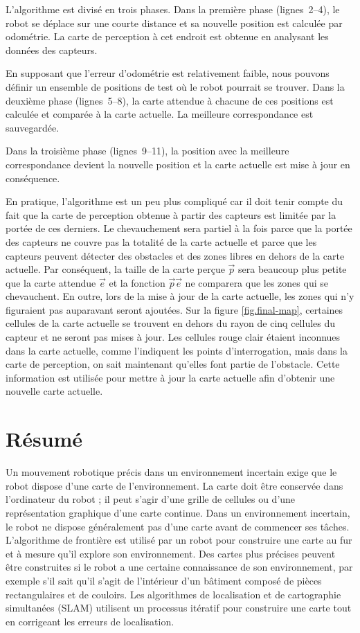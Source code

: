 L'algorithme est divisé en trois phases. Dans la première phase (lignes~2--4), le robot se déplace sur une courte distance et sa nouvelle position est calculée par odométrie. La carte de perception à cet endroit est obtenue en analysant les données des capteurs.

En supposant que l'erreur d'odométrie est relativement faible, nous pouvons définir un ensemble de positions de test où le robot pourrait se trouver. Dans la deuxième phase (lignes~5--8), la carte attendue à chacune de ces positions est calculée et comparée à la carte actuelle. La meilleure correspondance est sauvegardée.

Dans la troisième phase (lignes~9--11), la position avec la meilleure correspondance devient la nouvelle position et la carte actuelle est mise à jour en conséquence.

En pratique, l'algorithme est un peu plus compliqué car il doit tenir compte du fait que la carte de perception obtenue à partir des capteurs est limitée par la portée de ces derniers. Le chevauchement sera partiel à la fois parce que la portée des capteurs ne couvre pas la totalité de la carte actuelle et parce que les capteurs peuvent détecter des obstacles et des zones libres en dehors de la carte actuelle. Par conséquent, la taille de la carte perçue $\vec{p}$ sera beaucoup plus petite que la carte attendue $\vec{e}$ et la fonction $\vec{p}$\p{,}$\vec{e}$\p{)} ne comparera que les zones qui se chevauchent. En outre, lors de la mise à jour de la carte actuelle, les zones qui n'y figuraient pas auparavant seront ajoutées. Sur la figure \ref{fig.final-map}, certaines cellules de la carte actuelle se trouvent en dehors du rayon de cinq cellules du capteur et ne seront pas mises à jour. Les cellules rouge clair étaient inconnues dans la carte actuelle, comme l'indiquent les points d'interrogation, mais dans la carte de perception, on sait maintenant qu'elles font partie de l'obstacle. Cette information est utilisée pour mettre à jour la carte actuelle afin d'obtenir une nouvelle carte actuelle.

\section{Résumé}

Un mouvement robotique précis dans un environnement incertain exige que le robot dispose d'une carte de l'environnement. La carte doit être conservée dans l'ordinateur du robot ; il peut s'agir d'une grille de cellules ou d'une représentation graphique d'une carte continue. Dans un environnement incertain, le robot ne dispose généralement pas d'une carte avant de commencer ses tâches. L'algorithme de frontière est utilisé par un robot pour construire une carte au fur et à mesure qu'il explore son environnement. Des cartes plus précises peuvent être construites si le robot a une certaine connaissance de son environnement, par exemple s'il sait qu'il s'agit de l'intérieur d'un bâtiment composé de pièces rectangulaires et de couloirs. Les algorithmes de localisation et de cartographie simultanées (SLAM) utilisent un processus itératif pour construire une carte tout en corrigeant les erreurs de localisation.


